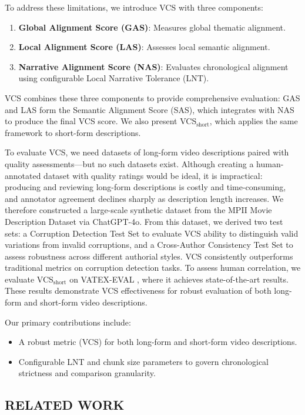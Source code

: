 \documentclass[main.tex]{subfiles}
\begin{document}
To address these limitations, we introduce VCS with three components:
\begin{enumerate}
\item \textbf{Global Alignment Score (GAS)}: Measures global thematic alignment.
\item \textbf{Local Alignment Score (LAS)}: Assesses local semantic alignment.
\item \textbf{Narrative Alignment Score (NAS)}: Evaluates chronological alignment using configurable Local Narrative Tolerance (LNT).
\end{enumerate}

VCS combines these three components to provide comprehensive evaluation: GAS and LAS form the Semantic Alignment Score (SAS), which integrates with NAS to produce the final VCS score. We also present VCS$_{\text{short}}$, which applies the same framework to short-form descriptions.

To evaluate VCS, we need datasets of long-form video descriptions paired with quality assessments—but no such datasets exist. Although creating a human-annotated dataset with quality ratings would be ideal, it is impractical: producing and reviewing long-form descriptions is costly and time-consuming, and annotator agreement declines sharply as description length increases. We therefore constructed a large-scale synthetic dataset from the MPII Movie Description Dataset \cite{rohrbach2015dataset} via ChatGPT-4o. From this dataset, we derived two test sets: a Corruption Detection Test Set to evaluate VCS ability to distinguish valid variations from invalid corruptions, and a Cross-Author Consistency Test Set to assess robustness across different authorial styles. VCS consistently outperforms traditional metrics on corruption detection tasks. To assess human correlation, we evaluate VCS$_{\text{short}}$ on VATEX-EVAL \cite{syxl:22}, where it achieves state-of-the-art results. These results demonstrate VCS effectiveness for robust evaluation of both long-form and short-form video descriptions.

Our primary contributions include:
\begin{itemize}
\item A robust metric (VCS) for both long-form and short-form video descriptions.
\item Configurable LNT and chunk size parameters to govern chronological strictness and comparison granularity.
\end{itemize}

\subsection{RELATED WORK}
\end{document}
